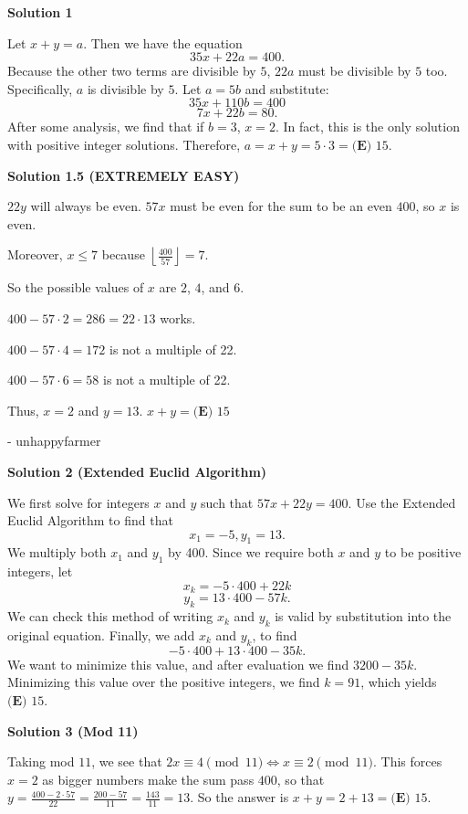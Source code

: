 \begin{enumerate}
\textbf{Solution 1}

Let $x+y = a$. Then we have the equation
 \[35x + 22a = 400.\]Because the other two terms are divisible by $5$, $22a$ must be divisible by $5$ too. Specifically, $a$ is divisible by $5$. Let $a=5b$ and substitute:
 \[35x + 110b = 400\]
 \[7x + 22b = 80.\]After some analysis, we find that if $b=3$, $x = 2$. In fact, this is the only solution with positive integer solutions. Therefore, $a = x+y = 5 \cdot 3 = \boxed{\textbf{(E) }15}$.

 



\textbf{Solution 1.5 (EXTREMELY EASY)}

$22y$ will always be even. $57x$ must be even for the sum to be an even $400$, so $x$ is even. 

 Moreover, $x\leq7$ because $\left\lfloor \frac{400}{57} \right\rfloor = 7$.

 So the possible values of $x$ are $2$, $4$, and $6$. 

 
$400 - 57\cdot2 = 286 = 22\cdot13$ works.

 $400 - 57\cdot4 = 172$ is not a multiple of 22.

 $400 - 57\cdot6 = 58$ is not a multiple of 22.

 
Thus, $x = 2$ and $y = 13$. $x + y = \boxed{\textbf{(E) }15}$

 - unhappyfarmer

 



\textbf{Solution 2 (Extended Euclid Algorithm)}

We first solve for integers $x$ and $y$ such that $57x+22y=400$. Use the Extended Euclid Algorithm to find that 
 \[x_1 = -5, y_1 = 13.\] We multiply both $x_1$ and $y_1$ by 400. Since we require both $x$ and $y$ to be positive integers, let 
 \[x_k = -5 \cdot 400 + 22k\] 
 \[y_k = 13 \cdot 400 - 57k.\] We can check this method of writing $x_k$ and $y_k$ is valid by substitution into the original equation. Finally, we add $x_k$ and $y_k$, to find 
 \[-5 \cdot 400 + 13 \cdot 400 - 35k.\] We want to minimize this value, and after evaluation we find $3200 - 35k$. Minimizing this value over the positive integers, we find $k = 91$, which yields $\boxed{\textbf{(E) }15}$.

 



\textbf{Solution 3 (Mod 11)}

Taking mod $11$, we see that $2x\equiv 4 \pmod{11}\iff x\equiv 2 \pmod{11}$. This forces $x=2$ as bigger numbers make the sum pass $400$, so that $y=\frac{400-2\cdot 57}{22}=\frac{200-57}{11}=\frac{143}{11}=13$. So the answer is $x+y=2+13=\boxed{ \textbf{(E) } 15 }$.


\end{enumerate}
